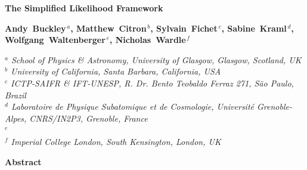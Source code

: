 \documentclass[11pt]{article}
\begin{document}
\vspace*{30mm}

\begin{center}
{\LARGE \bf The Simplified Likelihood Framework
}
\par\vspace*{20mm}\par

{\large \bf Andy~Buckley$^{\,a}$, Matthew~Citron$^{\,b}$,  Sylvain~Fichet$^{\,c}$, Sabine~Kraml$^{\,d}$, Wolfgang~Waltenberger$^{\,e}$, Nicholas~Wardle$^{\,f}$}

\bigskip

{\em $^a$ School of Physics \& Astronomy, University of Glasgow, Glasgow, Scotland, UK}
\\
{\em $^b$ University of California, Santa Barbara, California, USA}
\\
{\em $^c$ ICTP-SAIFR \& IFT-UNESP, R. Dr. Bento Teobaldo Ferraz 271, S\~ao Paulo, Brazil}
\\
{\em $^d$ Laboratoire de Physique Subatomique et de Cosmologie, Universit\'e Grenoble-Alpes, CNRS/IN2P3, Grenoble, France  }
\\
{\em $^e$ }
\\
{\em $^f$ Imperial College London, South Kensington, London, UK }
\vspace*{5mm}



\vspace*{15mm}

{  \bf  Abstract }

\end{center}
\vspace*{1mm}




\noindent
\begin{abstract}

We present the Simplified Likelihood framework, a systematic approximation scheme  for experimental likelihoods such as those originating from LHC experiments. This framework  can be used  to simplify data analyses and to transmit realistic experimental likelihoods to the community.
We present an efficient method to compute the parameters of the simplified likelihood  from Monte Carlo simulations. The approach is validated using a realistic LHC-like toy search. \ldots




\end{abstract}

\end{document}
